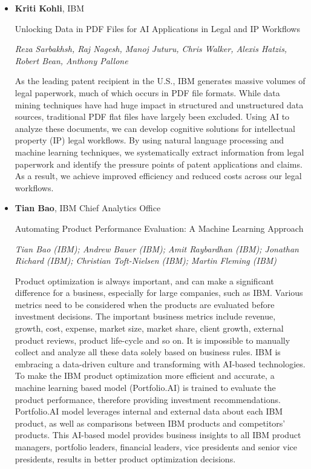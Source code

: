 \begin{itemize}
\item \textbf{Kriti Kohli}, IBM

Unlocking Data in PDF Files for AI Applications in Legal and IP Workflows

\emph{\footnotesize Reza Sarbakhsh, Raj Nagesh, Manoj Juturu, Chris Walker, Alexis Hatzis, Robert Bean, Anthony Pallone}

As the leading patent recipient in the U.S., IBM generates massive volumes of legal paperwork, much of which occurs in PDF file formats. While data mining techniques have had huge impact in structured and unstructured data sources, traditional PDF flat files have largely been excluded. Using AI to analyze these documents, we can develop cognitive solutions for intellectual property (IP) legal workflows. By using natural language processing and machine learning techniques, we systematically extract information from legal paperwork and identify the pressure points of patent applications and claims. As a result, we achieve improved efficiency and reduced costs across our legal workflows.

\item \textbf{Tian Bao}, IBM Chief Analytics Office

Automating Product Performance Evaluation: A Machine Learning Approach

\emph{\footnotesize Tian Bao (IBM); Andrew Bauer (IBM); Amit Raybardhan (IBM); Jonathan Richard (IBM); Christian Toft-Nielsen (IBM); Martin Fleming (IBM)}

Product optimization is always important, and can make a significant difference for a business, especially for large companies, such as IBM. Various metrics need to be considered when the products are evaluated before investment decisions. The important business metrics include revenue, growth, cost, expense, market size, market share, client growth, external product reviews, product life-cycle and so on. It is impossible to manually collect and analyze all these data solely based on business rules. IBM is embracing a data-driven culture and transforming with AI-based technologies. To make the IBM product optimization more efficient and accurate, a machine learning based model (Portfolio.AI) is trained to evaluate the product performance, therefore providing investment recommendations. Portfolio.AI model leverages internal and external data about each IBM product, as well as comparisons between IBM products and competitors’ products. This AI-based model provides business insights to all IBM product managers, portfolio leaders, financial leaders, vice presidents and senior vice presidents, results in better product optimization decisions.

\end{itemize}

